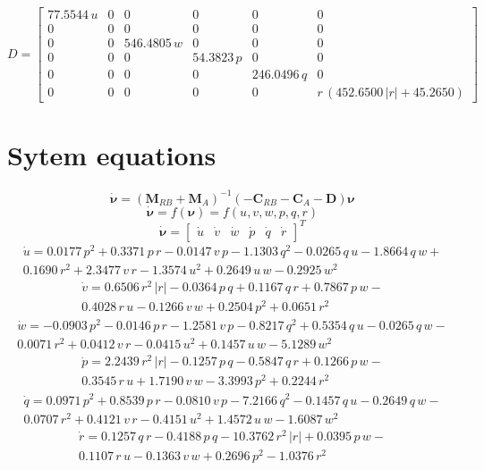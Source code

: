\documentclass[12pt,a4]{article}
\begin{document}
\begin{equation*}
	D = \left[\begin{array}{cccccc} 77.5544\,u & 0 & 0 & 0 & 0 & 0\\ 0 & 0 & 0 & 0 & 0 & 0\\ 0 & 0 & 546.4805\,w & 0 & 0 & 0\\ 0 & 0 & 0 & 54.3823\,p & 0 & 0\\ 0 & 0 & 0 & 0 & 246.0496\,q & 0\\ 0 & 0 & 0 & 0 & 0 & r\,\left(452.6500\,\left|r\right|+45.2650\right) \end{array}\right]
\end{equation*}


\section{Sytem equations}
\begin{equation}
	\dot{\bm{\nu}} = (\bm{M}_{RB}+\bm{M}_{A})^{-1}(-\bm{C}_{RB}-\bm{C}_{A}-\bm{D})\bm{\nu}
\end{equation}
\begin{equation}
	\dot{\bm{\nu}} = f(\bm{\nu}) = f(u, v, w, p, q, r)
\end{equation}
\begin{equation}
	\dot{\bm{\nu}} = \begin{bmatrix}\dot{u}&\dot{v}&\dot{w}&\dot{p}&\dot{q}&\dot{r}\end{bmatrix}^T
\end{equation}
\begin{multline}
	\dot{u} = 0.0177\,p^2+0.3371\,p\,r-0.0147\,v\,p-1.1303\,q^2-0.0265\,q\,u-1.8664\,q\,w+\\
	0.1690\,r^2+2.3477\,v\,r-1.3574\,u^2+0.2649\,u\,w-0.2925\,w^2
\end{multline}
\begin{multline}
	\dot{v} = 0.6506\,r^2\,\left|r\right|-0.0364\,p\,q+0.1167\,q\,r+0.7867\,p\,w-\\
	0.4028\,r\,u-0.1266\,v\,w+0.2504\,p^2+0.0651\,r^2
\end{multline}
\begin{multline}
	\dot{w} = -0.0903\,p^2-0.0146\,p\,r-1.2581\,v\,p-0.8217\,q^2+0.5354\,q\,u-0.0265\,q\,w-\\
	0.0071\,r^2+0.0412\,v\,r-0.0415\,u^2+0.1457\,u\,w-5.1289\,w^2
\end{multline}
\begin{multline}
	\dot{p} = 2.2439\,r^2\,\left|r\right|-0.1257\,p\,q-0.5847\,q\,r+0.1266\,p\,w-\\
	0.3545\,r\,u+1.7190\,v\,w-3.3993\,p^2+0.2244\,r^2
\end{multline}
\begin{multline}
	\dot{q} = 0.0971\,p^2+0.8539\,p\,r-0.0810\,v\,p-7.2166\,q^2-0.1457\,q\,u-0.2649\,q\,w-\\
	0.0707\,r^2+0.4121\,v\,r-0.4151\,u^2+1.4572\,u\,w-1.6087\,w^2
\end{multline}
\begin{multline}
	\dot{r} = 0.1257\,q\,r-0.4188\,p\,q-10.3762\,r^2\,\left|r\right|+0.0395\,p\,w-\\
	0.1107\,r\,u-0.1363\,v\,w+0.2696\,p^2-1.0376\,r^2
\end{multline}
\end{document}
